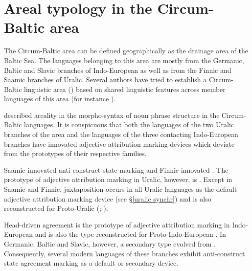 
\chapter{Areal typology in the Circum-Baltic area}\label{circumbaltic}
The Circum-Baltic area can be defined geographically as the drainage area of the Baltic Sea. The languages belonging to this area are mostly from the Germanic, Baltic and Slavic branches of Indo-European as well as from the Finnic and Saamic branches of Uralic. Several authors have tried to establish a Circum-Baltic linguistic area () based on shared linguistic features across member languages of this area (for instance \citealt{koptjevskaja-tamm2006}).

\cite{riesler2006a} described areality in the morpho-syntax of noun phrase structure in the Circum-Baltic languages. It is conspicuous that both the languages of the two Uralic branches of the area and the languages of the three contacting Indo-European branches have innovated adjective attribution marking devices which deviate from the prototypes of their respective families.

Saamic innovated anti\hyp{}construct state marking and Finnic innovated . The prototype of adjective attribution marking in Uralic, however, is . Except in Saamic and Finnic, juxtaposition occurs in all Uralic languages as the default adjective attribution marking device (see \S\ref{uralic synchr}) and is also reconstructed for Proto\hyp{}Uralic (\citealt[66, 81]{decsy1990}; \citealt[32]{janhunen1981}).

Head\hyp{}driven agreement is the prototype of adjective attribution marking in Indo-European and is also the type reconstructed for Proto\hyp{}Indo-European \citep{decsy1991,watkins1998}. In Germanic, Baltic and Slavic, however, a secondary type evolved from . Consequently, several modern languages of these branches exhibit anti\hyp{}construct state agreement marking as a default or secondary device.

